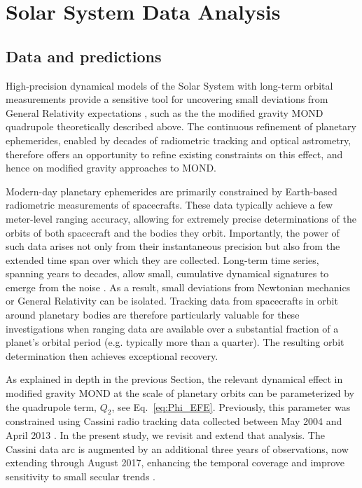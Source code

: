 \documentclass[reprint,nofootinbib,prd,aps]{revtex4-2}
\begin{document}
\section{Solar System Data Analysis}
\label{sec:analysis}
\subsection{Data and predictions}

High-precision dynamical models of the Solar System with long-term orbital measurements provide a sensitive tool for uncovering small deviations from General Relativity expectations \cite{hees_2014,park_2017,fienga:2024aa}, such as the the modified gravity MOND quadrupole theoretically described above. The continuous refinement of planetary ephemerides, enabled by decades of radiometric tracking and optical astrometry, therefore offers an opportunity to refine existing constraints on this effect, and hence on modified gravity approaches to MOND.

Modern-day planetary ephemerides are primarily constrained by Earth-based radiometric measurements of spacecrafts. These data typically achieve a few meter-level ranging accuracy, allowing for extremely precise determinations of the orbits of both spacecraft and the bodies they orbit. Importantly, the power of such data arises not only from their instantaneous precision but also from the extended time span over which they are collected. Long-term time series, spanning years to decades, allow small, cumulative dynamical signatures to emerge from the noise \cite{park2025io,park2025small}. As a result, small deviations from Newtonian mechanics or General Relativity can be isolated. Tracking data from spacecrafts in orbit around planetary bodies are therefore particularly valuable for these investigations when ranging data are available over a substantial fraction of a planet’s orbital period (e.g. typically more than a quarter). The resulting orbit determination then achieves exceptional recovery.

As explained in depth in the previous Section, the relevant dynamical effect in modified gravity MOND at the scale of planetary orbits can be parameterized by the quadrupole term, $Q_2$, see Eq.~\eqref{eq:Phi_EFE}. Previously, this parameter was constrained using Cassini radio tracking data collected between May 2004 and April 2013 \cite{hees_2014}. In the present study, we revisit and extend that analysis. The Cassini data arc is augmented by an additional three years of observations, now extending through August 2017, enhancing the temporal coverage and improve sensitivity to small secular trends \citep[DE440, see][]{park_2021}.
\end{document}
